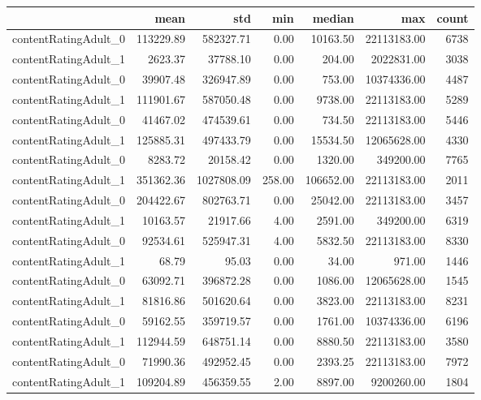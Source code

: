 \begin{tabular}{lrrrrrr}
\toprule
{} &      mean &        std &    min &    median &         max &  count \\
\midrule
contentRatingAdult\_0 & 113229.89 & 582327.71 & 0.00 & 10163.50 & 22113183.00 &  6738 \\
contentRatingAdult\_1 & 2623.37 & 37788.10 & 0.00 & 204.00 & 2022831.00 &  3038 \\
contentRatingAdult\_0 & 39907.48 & 326947.89 & 0.00 & 753.00 & 10374336.00 &  4487 \\
contentRatingAdult\_1 & 111901.67 & 587050.48 & 0.00 & 9738.00 & 22113183.00 &  5289 \\
contentRatingAdult\_0 & 41467.02 & 474539.61 & 0.00 & 734.50 & 22113183.00 &  5446 \\
contentRatingAdult\_1 & 125885.31 & 497433.79 & 0.00 & 15534.50 & 12065628.00 &  4330 \\
contentRatingAdult\_0 & 8283.72 & 20158.42 & 0.00 & 1320.00 & 349200.00 &  7765 \\
contentRatingAdult\_1 & 351362.36 & 1027808.09 & 258.00 & 106652.00 & 22113183.00 &  2011 \\
contentRatingAdult\_0 & 204422.67 & 802763.71 & 0.00 & 25042.00 & 22113183.00 &  3457 \\
contentRatingAdult\_1 & 10163.57 & 21917.66 & 4.00 & 2591.00 & 349200.00 &  6319 \\
contentRatingAdult\_0 & 92534.61 & 525947.31 & 4.00 & 5832.50 & 22113183.00 &  8330 \\
contentRatingAdult\_1 & 68.79 & 95.03 & 0.00 & 34.00 & 971.00 &  1446 \\
contentRatingAdult\_0 & 63092.71 & 396872.28 & 0.00 & 1086.00 & 12065628.00 &  1545 \\
contentRatingAdult\_1 & 81816.86 & 501620.64 & 0.00 & 3823.00 & 22113183.00 &  8231 \\
contentRatingAdult\_0 & 59162.55 & 359719.57 & 0.00 & 1761.00 & 10374336.00 &  6196 \\
contentRatingAdult\_1 & 112944.59 & 648751.14 & 0.00 & 8880.50 & 22113183.00 &  3580 \\
contentRatingAdult\_0 & 71990.36 & 492952.45 & 0.00 & 2393.25 & 22113183.00 &  7972 \\
contentRatingAdult\_1 & 109204.89 & 456359.55 & 2.00 & 8897.00 & 9200260.00 &  1804 \\
\bottomrule
\end{tabular}
